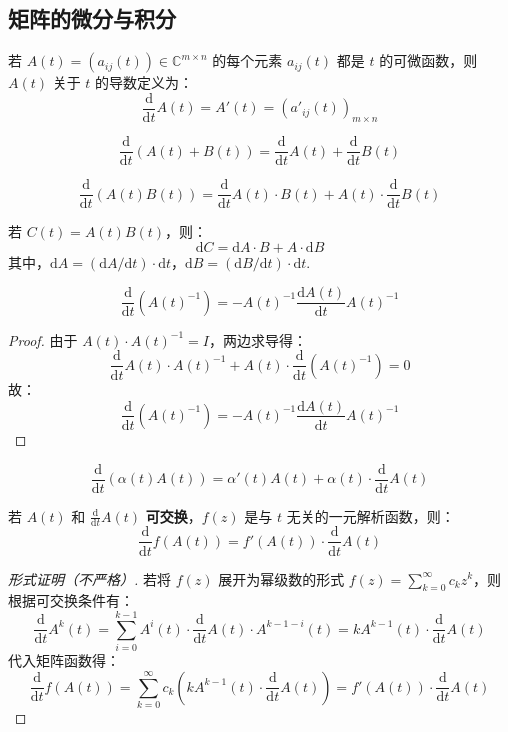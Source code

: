 \subsection{矩阵的微分与积分}

\begin{definition}[矩阵的导数]
若 $A(t)=\left(a_{ij}(t)\right)\in\mathbb C^{m\times n}$ 的每个元素 $a_{ij}(t)$ 都是 $t$ 的可微函数，则 $A(t)$ 关于 $t$ 的导数定义为：
\[
    \frac{\mathrm d}{\mathrm dt}A(t)=A'(t)=\left(a'_{ij}(t)\right)_{m\times n}
\]
\end{definition}
\begin{property}
\[
    \frac{\mathrm d}{\mathrm dt}(A(t)+B(t))=\frac{\mathrm d}{\mathrm dt}A(t)+\frac{\mathrm d}{\mathrm dt}B(t)
\]
\end{property}
\begin{property}
\[
    \frac{\mathrm d}{\mathrm dt}(A(t)B(t))=\frac{\mathrm d}{\mathrm dt}A(t)\cdot B(t)+A(t)\cdot\frac{\mathrm d}{\mathrm dt}B(t)
\]
\end{property}
\begin{corollary}
若 $C(t)=A(t)B(t)$，则：
\[
    \mathrm dC=\mathrm dA\cdot B+A\cdot\mathrm dB
\]
其中，$\mathrm dA=(\mathrm dA/\mathrm dt)\cdot \mathrm dt$，$\mathrm dB=(\mathrm dB/\mathrm dt)\cdot \mathrm dt$.
\end{corollary}

\begin{example}[逆矩阵的导数]
\[
    \frac{\mathrm d}{\mathrm dt}\left(A(t)^{-1}\right)=-A(t)^{-1}\frac{\mathrm dA(t)}{\mathrm dt}A(t)^{-1}
\]
\end{example}
\begin{proof}
由于 $A(t)\cdot A(t)^{-1}=I$，两边求导得：
\[
    \frac{\mathrm d}{\mathrm dt}A(t)\cdot A(t)^{-1}+A(t)\cdot\frac{\mathrm d}{\mathrm dt}\left(A(t)^{-1}\right)=0
\]
故：
\[
    \frac{\mathrm d}{\mathrm dt}\left(A(t)^{-1}\right)=-A(t)^{-1}\frac{\mathrm dA(t)}{\mathrm dt}A(t)^{-1}
\]
\end{proof}

\begin{property}
\[
    \frac{\mathrm d}{\mathrm dt}(\alpha(t)A(t))=\alpha'(t)A(t)+\alpha(t)\cdot\frac{\mathrm d}{\mathrm dt}A(t)
\]
\end{property} 
\begin{property}
若 $A(t)$ 和 $\frac{\mathrm d}{\mathrm dt}A(t)$ \textbf{可交换}，$f(z)$ 是与 $t$ 无关的一元解析函数，则：
\[
    \frac{\mathrm d}{\mathrm dt}f(A(t))=f'(A(t))\cdot\frac{\mathrm d}{\mathrm dt}A(t)
\]
\end{property}
\begin{proof}[形式证明（不严格）]
若将 $f(z)$ 展开为幂级数的形式 $f(z)=\sum_{k=0}^\infty c_kz^k$，则根据可交换条件有：
\[
    \frac{\mathrm d}{\mathrm dt}A^k(t)=\sum_{i=0}^{k-1}A^i(t)\cdot\frac{\mathrm d}{\mathrm dt}A(t)\cdot A^{k-1-i}(t)=kA^{k-1}(t)\cdot\frac{\mathrm d}{\mathrm dt}A(t)
\]
代入矩阵函数得：
\[
    \frac{\mathrm d}{\mathrm dt}f(A(t))=\sum_{k=0}^\infty c_k\left(kA^{k-1}(t)\cdot\frac{\mathrm d}{\mathrm dt}A(t)\right)=f'(A(t))\cdot\frac{\mathrm d}{\mathrm dt}A(t)
\]
\end{proof}

